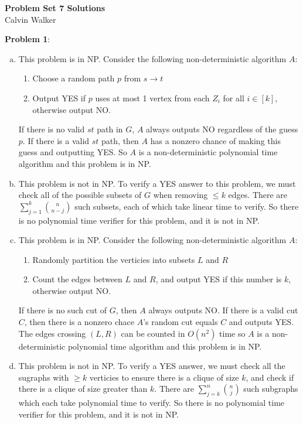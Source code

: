 \documentclass{article}
\begin{document}
\begin{center}
    \Large{\textbf{Problem Set 7 Solutions}} \\[0.25ex]
    Calvin Walker
\end{center}
\textbf{Problem 1}: \begin{enumerate}[(a)]
    \item This problem is in NP. Consider the following non-deterministic algorithm $A$: 
    \begin{enumerate}[1.]
        \item Choose a random path $p$ from $s \rightarrow t$
        \item Output YES if $p$ uses at most 1 vertex from each $Z_i$ for all $i \in [k]$, otherwise output NO. 
    \end{enumerate}
    If there is no valid $st$ path in $G$, $A$ always outputs NO regardless of the guess $p$. If there is a valid $st$ path, then $A$ has a nonzero chance of making this guess and outputting YES. So $A$ is a non-deterministic polynomial time algorithm and this problem is in NP. 
    \item This problem is not in NP. To verify a YES answer to this problem, we must check all of the possible subsets of $G$ when removing $\leq k$ edges. There are $\sum_{j = 1}^{k} \binom{n}{n - j}$ such subsets, each of which take linear time to verify. So there is no polynomial time verifier for this problem, and it is not in NP.
    \item This problem is in NP. Consider the following non-deterministic algorithm $A$: \begin{enumerate}[1.]
        \item Randomly partition the verticies into subsets $L$ and $R$
        \item Count the edges between $L$ and $R$, and output YES if this number is $k$, otherwise output NO.
    \end{enumerate}
    If there is no such cut of $G$, then $A$ always outputs NO. If there is a valid cut $C$, then there is a nonzero chace $A$'s random cut equals $C$ and outputs YES. The edges crossing $(L, R)$ can be counted in $O(n^2)$ time so $A$ is a non-deterministic polynomial time algorithm and this problem is in NP.
    \item This problem is not in NP. To verify a YES answer, we must check all the sugraphs with $\geq k$ verticies to ensure there is a clique of size $k$, and check if there is a clique of size greater than $k$. There are $\sum_{j = k}^{n} \binom{n}{j}$ such subgraphs which each take polynomial time to verify. So there is no polynomial time verifier for this problem, and it is not in NP.
\end{enumerate}
\end{document}
